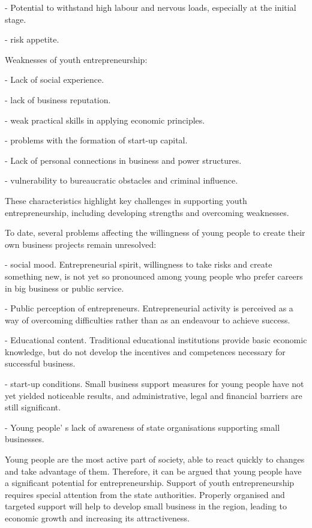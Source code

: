 - Potential to withstand high labour and nervous loads, especially at
the initial stage.

- risk appetite.

Weaknesses of youth entrepreneurship:

- Lack of social experience.

- lack of business reputation.

- weak practical skills in applying economic principles.

- problems with the formation of start-up capital.

- Lack of personal connections in business and power structures.

- vulnerability to bureaucratic obstacles and criminal influence.

These characteristics highlight key challenges in supporting youth
entrepreneurship, including developing strengths and overcoming
weaknesses.

To date, several problems affecting the willingness of young people to
create their own business projects remain unresolved:

- social mood. Entrepreneurial spirit, willingness to take risks and
create something new, is not yet so pronounced among young people who
prefer careers in big business or public service.

- Public perception of entrepreneurs. Entrepreneurial activity is
perceived as a way of overcoming difficulties rather than as an
endeavour to achieve success.

- Educational content. Traditional educational institutions provide
basic economic knowledge, but do not develop the incentives and
competences necessary for successful business.

- start-up conditions. Small business support measures for young people
have not yet yielded noticeable results, and administrative, legal and
financial barriers are still significant.

- Young people' s lack of awareness of state
organisations supporting small businesses.

Young people are the most active part of society, able to react quickly
to changes and take advantage of them. Therefore, it can be argued that
young people have a significant potential for entrepreneurship. Support
of youth entrepreneurship requires special attention from the state
authorities. Properly organised and targeted support will help to
develop small business in the region, leading to economic growth and
increasing its attractiveness.

